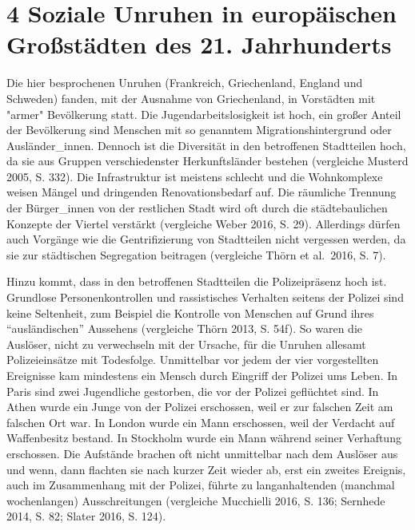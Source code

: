 \documentclass[a4paper,
fontsize=11pt,
oneside,
numbers=noperiodatend,
parskip=half-,
bibliography=totoc,
final
]{scrartcl}
\begin{document}
\hypertarget{soziale-unruhen-in-europuxe4ischen-grouxdfstuxe4dten-des-21.-jahrhunderts}{%
\section{4 Soziale Unruhen in europäischen Großstädten des 21.
Jahrhunderts}\label{soziale-unruhen-in-europuxe4ischen-grouxdfstuxe4dten-des-21.-jahrhunderts}}

Die hier besprochenen Unruhen (Frankreich, Griechenland, England und
Schweden) fanden, mit der Ausnahme von Griechenland, in Vorstädten mit
"armer" Bevölkerung statt. Die Jugendarbeitslosigkeit ist hoch, ein
großer Anteil der Bevölkerung sind Menschen mit so genanntem
Migrationshintergrund oder Ausländer\_innen. Dennoch ist die Diversität
in den betroffenen Stadtteilen hoch, da sie aus Gruppen verschiedenster
Herkunftsländer bestehen (vergleiche Musterd 2005, S. 332). Die
Infrastruktur ist meistens schlecht und die Wohnkomplexe weisen Mängel
und dringenden Renovationsbedarf auf. Die räumliche Trennung der
Bürger\_innen von der restlichen Stadt wird oft durch die
städtebaulichen Konzepte der Viertel verstärkt (vergleiche Weber 2016,
S. 29). Allerdings dürfen auch Vorgänge wie die Gentrifizierung von
Stadtteilen nicht vergessen werden, da sie zur städtischen Segregation
beitragen (vergleiche Thörn et al.~2016, S. 7).

Hinzu kommt, dass in den betroffenen Stadtteilen die Polizeipräsenz hoch
ist. Grundlose Personenkontrollen und rassistisches Verhalten seitens
der Polizei sind keine Seltenheit, zum Beispiel die Kontrolle von
Menschen auf Grund ihres \enquote{ausländischen} Aussehens (vergleiche
Thörn 2013, S. 54f). So waren die Auslöser, nicht zu verwechseln mit der
Ursache, für die Unruhen allesamt Polizeieinsätze mit Todesfolge.
Unmittelbar vor jedem der vier vorgestellten Ereignisse kam mindestens
ein Mensch durch Eingriff der Polizei ums Leben. In Paris sind zwei
Jugendliche gestorben, die vor der Polizei geflüchtet sind. In Athen
wurde ein Junge von der Polizei erschossen, weil er zur falschen Zeit am
falschen Ort war. In London wurde ein Mann erschossen, weil der Verdacht
auf Waffenbesitz bestand. In Stockholm wurde ein Mann während seiner
Verhaftung erschossen. Die Aufstände brachen oft nicht unmittelbar nach
dem Auslöser aus und wenn, dann flachten sie nach kurzer Zeit wieder ab,
erst ein zweites Ereignis, auch im Zusammenhang mit der Polizei, führte
zu langanhaltenden (manchmal wochenlangen) Ausschreitungen (vergleiche
Mucchielli 2016, S. 136; Sernhede 2014, S. 82; Slater 2016, S. 124).
\end{document}
